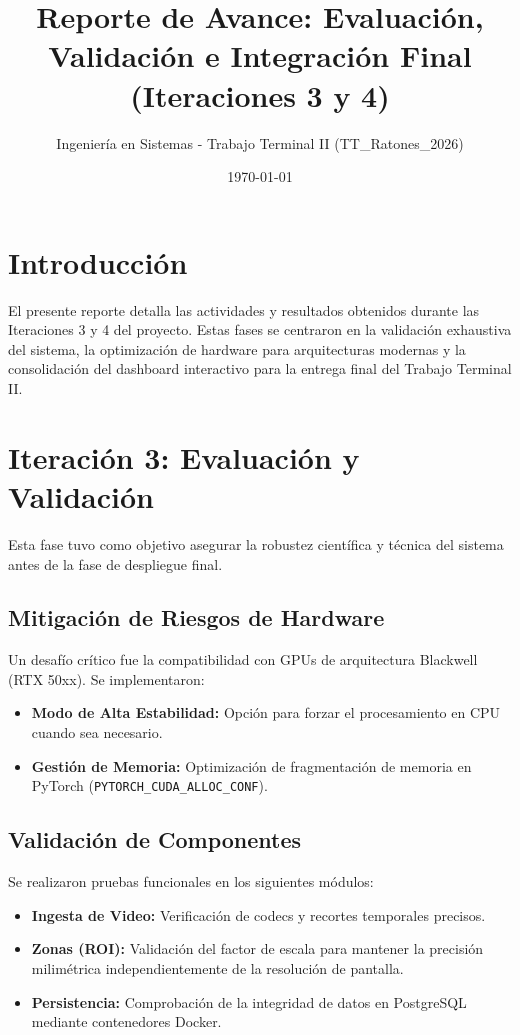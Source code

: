 \documentclass[12pt,a4paper]{article}
\title{\textbf{Reporte de Avance: Evaluación, Validación e Integración Final (Iteraciones 3 y 4)}}
\author{Ingeniería en Sistemas - Trabajo Terminal II (TT\_Ratones\_2026)}
\date{\today}
\begin{document}
\maketitle

\section{Introducción}
El presente reporte detalla las actividades y resultados obtenidos durante las Iteraciones 3 y 4 del proyecto. Estas fases se centraron en la validación exhaustiva del sistema, la optimización de hardware para arquitecturas modernas y la consolidación del dashboard interactivo para la entrega final del Trabajo Terminal II.

\section{Iteración 3: Evaluación y Validación}
Esta fase tuvo como objetivo asegurar la robustez científica y técnica del sistema antes de la fase de despliegue final.

\subsection{Mitigación de Riesgos de Hardware}
Un desafío crítico fue la compatibilidad con GPUs de arquitectura Blackwell (RTX 50xx). Se implementaron:
\begin{itemize}
    \item \textbf{Modo de Alta Estabilidad:} Opción para forzar el procesamiento en CPU cuando sea necesario.
    \item \textbf{Gestión de Memoria:} Optimización de fragmentación de memoria en PyTorch (\texttt{PYTORCH\_CUDA\_ALLOC\_CONF}).
\end{itemize}

\subsection{Validación de Componentes}
Se realizaron pruebas funcionales en los siguientes módulos:
\begin{itemize}
    \item \textbf{Ingesta de Video:} Verificación de codecs y recortes temporales precisos.
    \item \textbf{Zonas (ROI):} Validación del factor de escala para mantener la precisión milimétrica independientemente de la resolución de pantalla.
    \item \textbf{Persistencia:} Comprobación de la integridad de datos en PostgreSQL mediante contenedores Docker.
\end{itemize}
\end{document}

